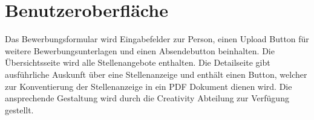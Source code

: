 \section{Benutzeroberfläche}
    Das Bewerbungsformular wird Eingabefelder zur Person, einen Upload Button für weitere Bewerbungsunterlagen und einen Absendebutton beinhalten. Die Übersichtsseite wird alle Stellenangebote enthalten. Die Detailseite gibt ausführliche Auskunft über eine Stellenanzeige und enthält einen Button, welcher zur
    \gls{Konventierung} der Stellenanzeige in ein PDF Dokument dienen wird. Die ansprechende Gestaltung wird durch die Creativity Abteilung zur Verfügung gestellt.